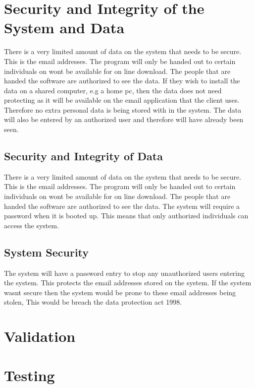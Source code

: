 \section{Security and Integrity of the System and Data}
There is a very limited amount of data on the system that needs to be secure. This is the email addresses. The program will only be handed out to certain individuals on wont be available for on line download. The people that are handed the software are authorized to see the data. If they wish to install the data on a shared computer, e.g a home pc, then the data does not need protecting as it will be available on the email application that the client uses. Therefore no extra personal data is being stored with in the system. The data will also be entered by an authorized user and therefore will have already been seen. 

\subsection{Security and Integrity of Data}
There is a very limited amount of data on the system that needs to be secure. This is the email addresses. The program will only be handed out to certain individuals on wont be available for on line download. The people that are handed the software are authorized to see the data. The system will require a password when it is booted up. This means that only authorized individuals can access the system.  

\subsection{System Security}
The system will have a password entry to stop any unauthorized users entering the system. This protects the email addresses stored on the system. If the system wasnt secure then the system would be prone to these email addresses being stolen, This would be breach the data protection act 1998. 
\section{Validation}

\section{Testing}

